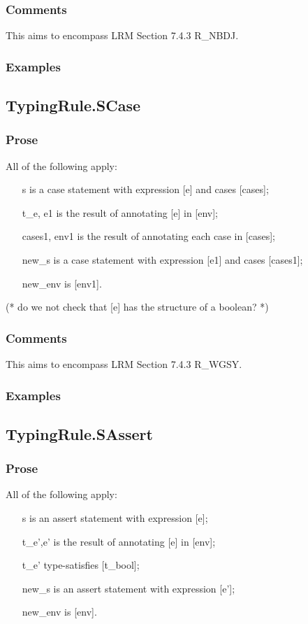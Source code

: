 \documentclass{book}
\begin{document}
    \subsubsection{Comments}
    This aims to encompass LRM Section 7.4.3 R\_NBDJ.

    \subsubsection{Examples}

\subsection{TypingRule.SCase}

    \subsubsection{Prose}
    All of the following apply:
   \begin{itemize}
   \item [s] is a case statement with expression [e] and cases [cases];
   \item [t\_e, e1] is the result of annotating [e] in [env];
   \item [cases1, env1] is the result of annotating each case in [cases];
   \item [new\_s] is a case statement with expression [e1] and cases [cases1];
   \item [new\_env] is [env1].
   \end{itemize}
    (* do we not check that [e] has the structure of a boolean? *)

    \subsubsection{Comments}
    This aims to encompass LRM Section 7.4.3 R\_WGSY.

    \subsubsection{Examples}

\subsection{TypingRule.SAssert}

    \subsubsection{Prose}
    All of the following apply:
   \begin{itemize}
   \item [s] is an assert statement with expression [e];
   \item [t\_e',e'] is the result of annotating [e] in [env];
   \item [t\_e'] type-satisfies [t\_bool];  
   \item [new\_s] is an assert statement with expression [e'];
   \item [new\_env] is [env].
   \end{itemize}
\end{document}
